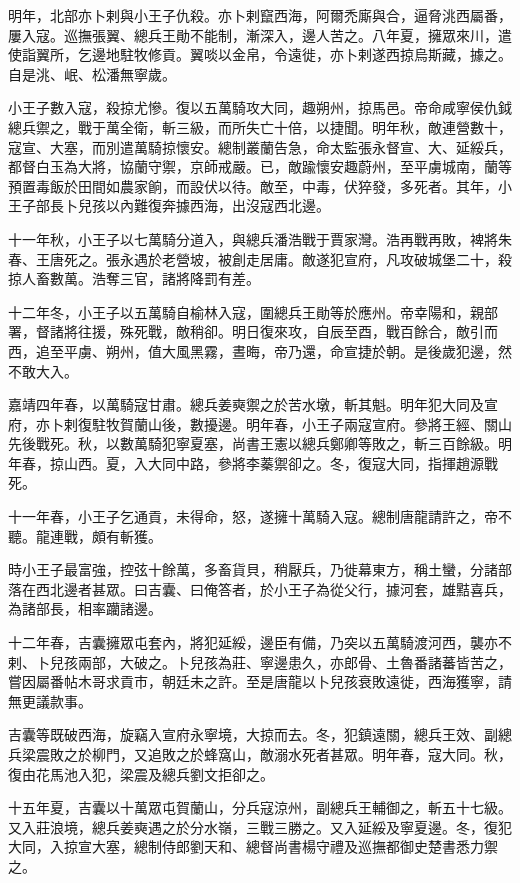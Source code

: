 \begin{pinyinscope}
明年，北部亦卜剌與小王子仇殺。亦卜剌竄西海，阿爾禿廝與合，逼脅洮西屬番，屢入寇。巡撫張翼、總兵王勛不能制，漸深入，邊人苦之。八年夏，擁眾來川，遣使詣翼所，乞邊地駐牧修貢。翼啖以金帛，令遠徙，亦卜剌遂西掠烏斯藏，據之。自是洮、岷、松潘無寧歲。

小王子數入寇，殺掠尤慘。復以五萬騎攻大同，趣朔州，掠馬邑。帝命咸寧侯仇鉞總兵禦之，戰于萬全衛，斬三級，而所失亡十倍，以捷聞。明年秋，敵連營數十，寇宣、大塞，而別遣萬騎掠懷安。總制叢蘭告急，命太監張永督宣、大、延綏兵，都督白玉為大將，協蘭守禦，京師戒嚴。已，敵踰懷安趣蔚州，至平虜城南，蘭等預置毒飯於田間如農家餉，而設伏以待。敵至，中毒，伏猝發，多死者。其年，小王子部長卜兒孩以內難復奔據西海，出沒寇西北邊。

十一年秋，小王子以七萬騎分道入，與總兵潘浩戰于賈家灣。浩再戰再敗，裨將朱春、王唐死之。張永遇於老營坡，被創走居庸。敵遂犯宣府，凡攻破城堡二十，殺掠人畜數萬。浩奪三官，諸將降罰有差。

十二年冬，小王子以五萬騎自榆林入寇，圍總兵王勛等於應州。帝幸陽和，親部署，督諸將往援，殊死戰，敵稍卻。明日復來攻，自辰至酉，戰百餘合，敵引而西，追至平虜、朔州，值大風黑霧，晝晦，帝乃還，命宣捷於朝。是後歲犯邊，然不敢大入。

嘉靖四年春，以萬騎寇甘肅。總兵姜奭禦之於苦水墩，斬其魁。明年犯大同及宣府，亦卜剌復駐牧賀蘭山後，數擾邊。明年春，小王子兩寇宣府。參將王經、關山先後戰死。秋，以數萬騎犯寧夏塞，尚書王憲以總兵鄭卿等敗之，斬三百餘級。明年春，掠山西。夏，入大同中路，參將李蓁禦卻之。冬，復寇大同，指揮趙源戰死。

十一年春，小王子乞通貢，未得命，怒，遂擁十萬騎入寇。總制唐龍請許之，帝不聽。龍連戰，頗有斬獲。

時小王子最富強，控弦十餘萬，多畜貨貝，稍厭兵，乃徙幕東方，稱土蠻，分諸部落在西北邊者甚眾。曰吉囊、曰俺答者，於小王子為從父行，據河套，雄黠喜兵，為諸部長，相率躪諸邊。

十二年春，吉囊擁眾屯套內，將犯延綏，邊臣有備，乃突以五萬騎渡河西，襲亦不剌、卜兒孩兩部，大破之。卜兒孩為莊、寧邊患久，亦郎骨、土魯番諸蕃皆苦之，嘗因屬番帖木哥求貢市，朝廷未之許。至是唐龍以卜兒孩衰敗遠徙，西海獲寧，請無更議款事。

吉囊等既破西海，旋竊入宣府永寧境，大掠而去。冬，犯鎮遠關，總兵王效、副總兵梁震敗之於柳門，又追敗之於蜂窩山，敵溺水死者甚眾。明年春，寇大同。秋，復由花馬池入犯，梁震及總兵劉文拒卻之。

十五年夏，吉囊以十萬眾屯賀蘭山，分兵寇涼州，副總兵王輔御之，斬五十七級。又入莊浪境，總兵姜奭遇之於分水嶺，三戰三勝之。又入延綏及寧夏邊。冬，復犯大同，入掠宣大塞，總制侍郎劉天和、總督尚書楊守禮及巡撫都御史楚書悉力禦之。


\end{pinyinscope}
